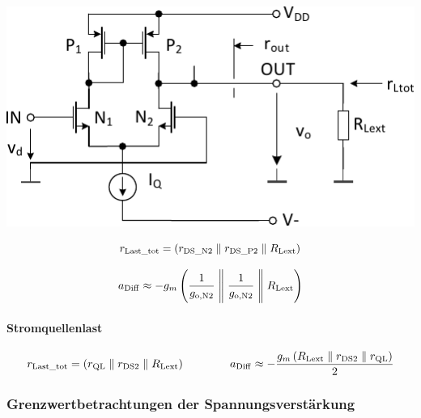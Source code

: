 \begin{minipage}[t]{0.45\columnwidth}
    \includegraphics[width=\columnwidth, align=t]{images/09_differenzstufe_kleinsignal_verstaerkung_stromspiegel.pdf}
\end{minipage}
\hfill
\begin{minipage}[t]{0.5\columnwidth}
    \[
        r_{\rm Last\_tot} =  \left( r_{\rm DS\_N2} \parallel r_{\rm DS\_P2} \parallel R_{\rm Lext} \right)
    \]

    \vspace{-0.2cm}

    \[
        a_{\rm Diff} \approx - g_m \left(\frac{1}{g_{\rm o, N2}} \Biggm\Vert \frac{1}{g_{\rm o, N2}} \Biggm\Vert R_{\rm Lext}\right)
    \]
\end{minipage}




\paragraph{Stromquellenlast}    %

\vspace{-0.2cm}



\[
    r_{\rm Last\_tot} =  \left( r_{\rm QL} \parallel r_{\rm DS2} \parallel R_{\rm Lext} \right) \qquad \qquad
    a_{\rm Diff} \approx - \frac{ g_m \left( R_{\rm Lext} \parallel r_{\rm DS2} \parallel r_{\rm QL} \right) }{2}
\]



\subsubsection{Grenzwertbetrachtungen der Spannungsverstärkung}

